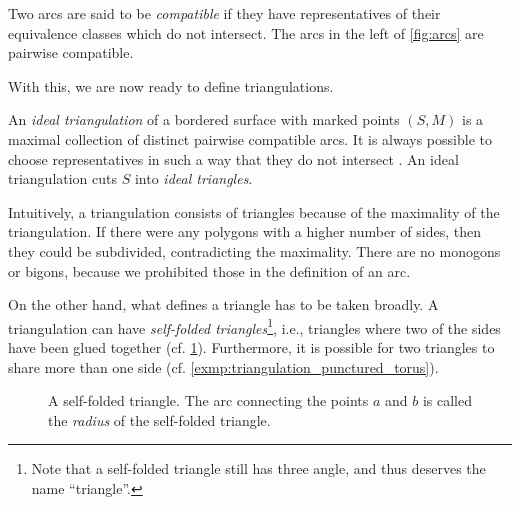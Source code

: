 \begin{definition}

	Two arcs are said to be \emph{compatible} if they have
	representatives of their equivalence classes which do not intersect. The arcs in the
	left of \cref{fig:arcs} are pairwise compatible.
\end{definition}

With this, we are now ready to define triangulations.

\begin{definition}

	An \emph{ideal triangulation} of a bordered surface with
	marked points $(S, M)$ is a maximal collection of distinct pairwise compatible arcs. It
	is always possible to choose representatives in such a way that they do not intersect \parencite[Proposition 2.5]{FominShapiroThurston2008CATriangulatedSurfacesI}. An ideal
	triangulation cuts $S$ into \emph{ideal triangles}.
\end{definition}

Intuitively, a triangulation consists of triangles because of the maximality of the
triangulation. If there were any polygons with a higher number of sides, then they
could be subdivided, contradicting the maximality. There are no monogons or bigons,
because we prohibited those in the definition of an arc.

On the other hand, what defines a triangle has to be taken broadly. A triangulation can
have \emph{self-folded triangles}\footnote{Note that a
	self-folded triangle still has three angle, and thus deserves the name ``triangle''.},
i.e., triangles where two of the sides have been glued together (cf.
\cref{fig:self_folded}). Furthermore, it is possible for two triangles to share more
than one side (cf. \cref{exmp:triangulation_punctured_torus}).
\begin{figure}[ht!]
	\centering


	\caption{A self-folded triangle. The arc connecting the points $a$ and $b$ is called the \emph{radius} of the self-folded triangle.}
	\label{fig:self_folded}
\end{figure}

